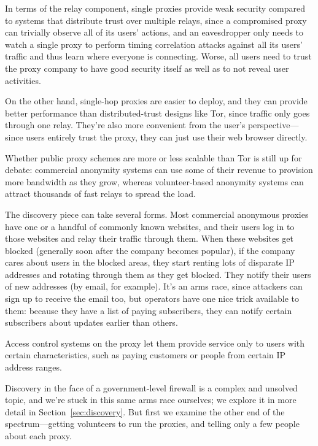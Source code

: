 \documentclass{llncs}
\begin{document}
In terms of the relay component, single proxies provide weak security
compared to systems that distribute trust over multiple relays, since a
compromised proxy can trivially observe all of its users' actions, and
an eavesdropper only needs to watch a single proxy to perform timing
correlation attacks against all its users' traffic and thus learn where
everyone is connecting. Worse, all users
need to trust the proxy company to have good security itself as well as
to not reveal user activities.

On the other hand, single-hop proxies are easier to deploy, and they
can provide better performance than distributed-trust designs like Tor,
since traffic only goes through one relay. They're also more convenient
from the user's perspective---since users entirely trust the proxy,
they can just use their web browser directly.

Whether public proxy schemes are more or less scalable than Tor is
still up for debate: commercial anonymity systems can use some of their
revenue to provision more bandwidth as they grow, whereas volunteer-based
anonymity systems can attract thousands of fast relays to spread the load.

The discovery piece can take several forms. Most commercial anonymous
proxies have one or a handful of commonly known websites, and their users
log in to those websites and relay their traffic through them. When
these websites get blocked (generally soon after the company becomes
popular), if the company cares about users in the blocked areas, they
start renting lots of disparate IP addresses and rotating through them
as they get blocked. They notify their users of new addresses (by email,
for example). It's an arms race, since attackers can sign up to receive the
email too, but operators have one nice trick available to them: because they
have a list of paying subscribers, they can notify certain subscribers
about updates earlier than others.

Access control systems on the proxy let them provide service only to
users with certain characteristics, such as paying customers or people
from certain IP address ranges.

Discovery in the face of a government-level firewall is a complex and
unsolved
topic, and we're stuck in this same arms race ourselves; we explore it
in more detail in Section~\ref{sec:discovery}. But first we examine the
other end of the spectrum---getting volunteers to run the proxies,
and telling only a few people about each proxy.
\end{document}
